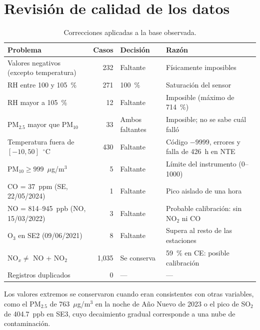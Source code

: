 \documentclass[11pt]{article}
\begin{document}
 


\pagebreak
 
\appendix

\section{Revisión de calidad de los datos}
\label{anexo:limpieza}
 
\begin{table}[H]
\centering
\small
\caption{Correcciones aplicadas a la base observada.}
\begin{tabular}{p{4.2cm}rp{2.6cm}p{5.6cm}}
\toprule
\textbf{Problema} & \textbf{Casos} & \textbf{Decisión} & \textbf{Razón} \\
\midrule
Valores negativos (excepto temperatura) & 232 & Faltante & Físicamente imposibles \\
RH entre 100 y 105~\% & 271 & 100~\% & Saturación del sensor \\
RH mayor a 105~\% & 12 & Faltante & Imposible (máximo de 714~\%) \\
PM$_{2.5}$ mayor que PM$_{10}$ & 33 & Ambos faltantes & Imposible; no se sabe cuál falló \\
Temperatura fuera de $[-10, 50]$~$^\circ$C & 430 & Faltante & Código $-9999$, errores y falla de 426~h en NTE \\
PM$_{10} \geq 999$~$\mu$g/m$^3$ & 5 & Faltante & Límite del instrumento (0--1000) \\
CO = 37~ppm (SE, 22/05/2024) & 1 & Faltante & Pico aislado de una hora \\
NO = 814--945~ppb (NO, 15/03/2022) & 3 & Faltante & Probable calibración: sin NO$_2$ ni CO \\
O$_3$ en SE2 (09/06/2021) & 8 & Faltante & Supera al resto de las estaciones \\
NO$_x \neq$ NO + NO$_2$ & 1{,}035 & Se conserva & 59~\% en CE: posible calibración \\
Registros duplicados & 0 & --- & --- \\
\bottomrule
\end{tabular}
\end{table}
 
Los valores extremos se conservaron cuando eran consistentes con otras variables, como el PM$_{2.5}$ de 763~$\mu$g/m$^3$ en la noche de Año Nuevo de 2023 o el pico de SO$_2$ de 404.7~ppb en SE3, cuyo decaimiento gradual corresponde a una nube de contaminación.
 
\end{document}
